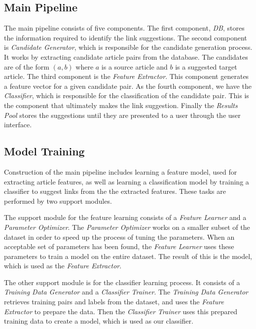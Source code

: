 \subsection{Main Pipeline}
The main pipeline consists of five components. The first component, \emph{DB}, stores the information required to identify the link suggestions. The second component is \emph{Candidate Generator}, which is responsible for the candidate generation process. It works by extracting candidate article pairs from the database. The candidates are of the form $(a,b)$ where $a$ is a source article and $b$ is a suggested target article. The third component is the \emph{Feature Extractor}. This component generates a feature vector for a given candidate pair. As the fourth component, we have the \emph{Classifier}, which is responsible for the classification of the candidate pair. This is the component that ultimately makes the link suggestion. Finally the \emph{Results Pool} stores the suggestions until they are presented to a user through the user interface.

\subsection{Model Training}
Construction of the main pipeline includes learning a feature model, used for extracting article features, as well as learning a classification model by training a classifier to suggest links from the the extracted features. These tasks are performed by two support modules.

The support module for the feature learning consists of a \emph{Feature Learner} and a \emph{Parameter Optimizer}. The \emph{Parameter Optimizer} works on a smaller subset of the dataset in order to speed up the process of tuning the parameters. When an acceptable set of parameters has been found, the \emph{Feature Learner} uses these parameters to train a model on the entire dataset. The result of this is the model, which is used as the \emph{Feature Extractor}.

The other support module is for the classifier learning process. It consists of a \emph{Training Data Generator} and a \emph{Classifier Trainer}. The \emph{Training Data Generator} retrieves training pairs and labels from the dataset, and uses the \emph{Feature Extractor} to prepare the data. Then the \emph{Classifier Trainer} uses this prepared training data to create a model, which is used as our classifier.

